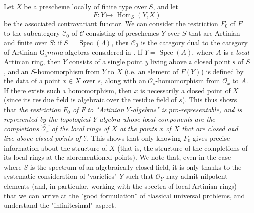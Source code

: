 Let $X$ be a prescheme locally of finite type over $S$, and let
\[
    F\colon Y \mapsto \operatorname{Hom}_S(Y,X)
\]
be the associated contravariant functor.
We can consider the restriction $F_0$ of $F$ to the subcategory $\mathcal{C}_0$ of $\mathcal{C}$ consisting of preschemes $Y$ over $S$ that are Artinian and finite over $S$:
if $S=\operatorname{Spec}(\Lambda)$, then $\mathcal{C}_0$ is the category dual to the category of Artinian $\operatorname{G_a}mma$-algebras considered in .
If $Y=\operatorname{Spec}(A)$, where $A$ is a \emph{local} Artinian ring, then $Y$ consists of a single point $y$ living above a closed point $s$ of $S$, and an $S$-homomorphism from $Y$ to $X$ (i.e. an element of $F(Y)$) is defined by the data of a point $x\in X$ over $s$, along with an $\mathcal{O}_s$-homomorphism from $\mathcal{O}_x$ to $A$.
If there exists such a homomorphism, then $x$ is necessarily a closed point of $X$ (since its residue field is algebraic over the residue field of $s$).
This thus shows that \emph{the restriction $F_0$ of $F$ to "Artinian $Y$-algebras" is pro-representable, and is represented by the topological $Y$-algebra whose local components are the completions $\widehat{\mathcal{O}_x}$ of the local rings of $X$ at the points $x$ of $X$ that are closed and live above closed points of $Y$}.
This shows that only knowing $F_0$ gives precise information about the structure of $X$ (that is, the structure of the completions of its local rings at the aforementioned points).
We note that, even in the case where $S$ is the spectrum of an algebraically closed field, it is only thanks to the systematic consideration of "varieties" $Y$ such that $\mathcal{O}_Y$ may admit nilpotent elements (and, in particular, working with the spectra of local Artinian rings) that we can arrive at the "good formulation" of classical universal problems, and understand the "infinitesimal" aspect.


